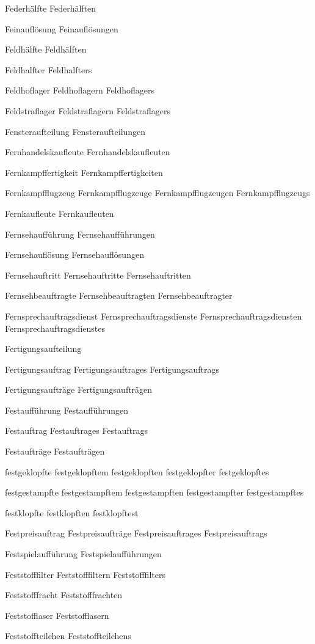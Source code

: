 Federhälfte
Federhälften

Feinauflösung
Feinauflösungen

Feldhälfte
Feldhälften

Feldhalfter
Feldhalfters

Feldhoflager
Feldhoflagern
Feldhoflagers

Feldstraflager
Feldstraflagern
Feldstraflagers

Fensteraufteilung
Fensteraufteilungen

Fernhandelskaufleute
Fernhandelskaufleuten

Fernkampffertigkeit
Fernkampffertigkeiten

Fernkampfflugzeug
Fernkampfflugzeuge
Fernkampfflugzeugen
Fernkampfflugzeugs

Fernkaufleute
Fernkaufleuten

Fernsehaufführung
Fernsehaufführungen

Fernsehauflösung
Fernsehauflösungen

Fernsehauftritt
Fernsehauftritte
Fernsehauftritten

Fernsehbeauftragte
Fernsehbeauftragten
Fernsehbeauftragter

Fernsprechauftragsdienst
Fernsprechauftragsdienste
Fernsprechauftragsdiensten
Fernsprechauftragsdienstes

Fertigungsaufteilung

Fertigungsauftrag
Fertigungsauftrages
Fertigungsauftrags

Fertigungsaufträge
Fertigungsaufträgen

Festaufführung
Festaufführungen

Festauftrag
Festauftrages
Festauftrags

Festaufträge
Festaufträgen

festgeklopfte
festgeklopftem
festgeklopften
festgeklopfter
festgeklopftes

festgestampfte
festgestampftem
festgestampften
festgestampfter
festgestampftes

festklopfte
festklopften
festklopftest

Festpreisauftrag
Festpreisaufträge
Festpreisauftrages
Festpreisauftrags

Festspielaufführung
Festspielaufführungen

Feststofffilter
Feststofffiltern
Feststofffilters

Feststofffracht
Feststofffrachten

Feststofflaser
Feststofflasern

Feststoffteilchen
Feststoffteilchens


